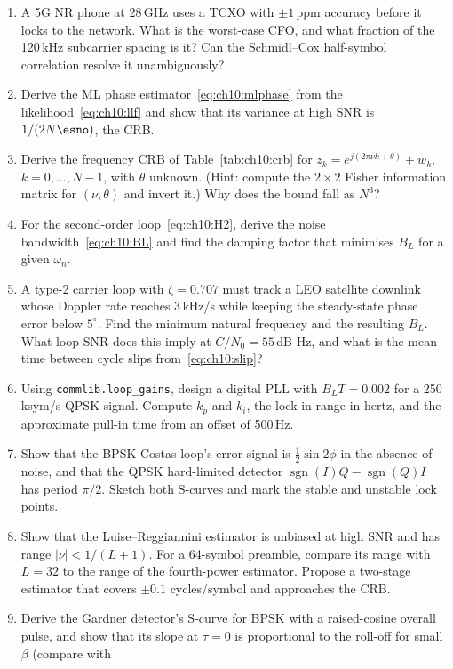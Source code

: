 \problems
\begin{enumerate}[label=\thechapter.\arabic*]
\item A 5G NR phone at 28\,GHz uses a TCXO with $\pm1$\,ppm accuracy before it locks to the network.
What is the worst-case CFO, and what fraction of the 120\,kHz subcarrier spacing is it? Can the
Schmidl--Cox half-symbol correlation resolve it unambiguously?
\item Derive the ML phase estimator~\eqref{eq:ch10:mlphase} from the likelihood~\eqref{eq:ch10:llf}
and show that its variance at high SNR is $1/(2N\esno)$, the CRB.
\item Derive the frequency CRB of Table~\ref{tab:ch10:crb} for $z_k=e^{j(2\pi\nu k+\theta)}+w_k$,
$k=0,\dots,N-1$, with $\theta$ unknown. (Hint: compute the $2\times2$ Fisher information matrix for
$(\nu,\theta)$ and invert it.) Why does the bound fall as $N^3$?
\item For the second-order loop~\eqref{eq:ch10:H2}, derive the noise bandwidth~\eqref{eq:ch10:BL} and
find the damping factor that minimises $B_L$ for a given $\omega_n$.
\item A type-2 carrier loop with $\zeta=0.707$ must track a LEO satellite downlink whose Doppler rate
reaches 3\,kHz/s while keeping the steady-state phase error below $5^\circ$. Find the minimum natural
frequency and the resulting $B_L$. What loop SNR does this imply at $C/N_0=55$\,dB-Hz, and what is the
mean time between cycle slips from~\eqref{eq:ch10:slip}?
\item Using \texttt{commlib.loop\_gains}, design a digital PLL with $B_LT=0.002$ for a 250\,ksym/s QPSK
signal. Compute $k_p$ and $k_i$, the lock-in range in hertz, and the approximate pull-in time from an
offset of 500\,Hz.
\item Show that the BPSK Costas loop's error signal is $\tfrac12\sin2\phi$ in the absence of noise, and
that the QPSK hard-limited detector $\operatorname{sgn}(I)Q-\operatorname{sgn}(Q)I$ has period $\pi/2$.
Sketch both S-curves and mark the stable and unstable lock points.
\item Show that the Luise--Reggiannini estimator is unbiased at high SNR and has range $|\nu|<1/(L+1)$.
For a 64-symbol preamble, compare its range with $L=32$ to the range of the fourth-power estimator.
Propose a two-stage estimator that covers $\pm0.1$ cycles/symbol and approaches the CRB.
\item Derive the Gardner detector's S-curve for BPSK with a raised-cosine overall pulse, and show that
its slope at $\tau=0$ is proportional to the roll-off for small $\beta$ (compare with

\end{enumerate}
